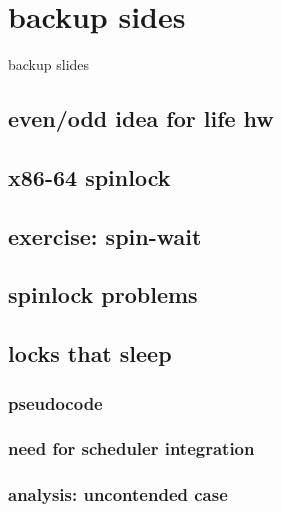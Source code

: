 \section{backup sides}
\begin{frame}{}
\end{frame}

\begin{frame}{backup slides}
\end{frame}

\subsection{even/odd idea for life hw}


\subsection{x86-64 spinlock}


\subsection{exercise: spin-wait}


\subsection{spinlock problems}


\subsection{locks that sleep}



\subsubsection{pseudocode}


\subsubsection{need for scheduler integration}


\subsubsection{analysis: uncontended case}



